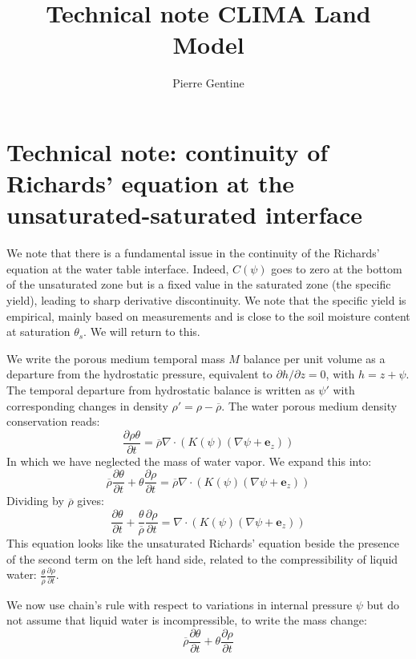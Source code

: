 \documentclass{article}
\title{Technical note CLIMA Land Model}
\author{Pierre Gentine}
\begin{document}
\section{Technical note: continuity of Richards' equation at the unsaturated-saturated interface}
We note that there is a fundamental issue in the continuity of the Richards' equation at the water table interface. Indeed, $C(\psi)$ goes to zero at the bottom of the unsaturated zone but is a fixed value in the saturated zone (the specific yield), leading to sharp derivative discontinuity. We note that the specific yield is empirical, mainly based on measurements and is close to the soil moisture content at saturation $\theta_s$. We will return to this.

We write the porous medium temporal mass $M$ balance per unit volume as a departure from the hydrostatic pressure, equivalent to $\partial h/\partial z=0$, with $h=z+\psi$. The temporal departure from hydrostatic balance is written as $\psi'$ with corresponding changes in density $\rho'=\rho-\overline\rho$. The water porous medium density conservation reads:
\begin{equation}
\frac{\partial \rho \theta}{\partial t} = {\overline{\rho}} \nabla \cdot \left( K(\psi) \left( \nabla \psi + {\mathbf e_z} \right) \right)
\end{equation}
In which we have neglected the mass of water vapor.
We expand this into:
\begin{equation}
{\overline \rho} \frac{\partial \theta}{\partial t} + \theta \frac{\partial \rho}{\partial t} = {\overline \rho} \nabla \cdot \left( K(\psi) \left( \nabla \psi + {\mathbf e_z} \right) \right)
\end{equation}
Dividing by $\overline \rho$ gives:
\begin{equation}
\frac{\partial \theta}{\partial t} + \frac{\theta}{\overline \rho} \frac{\partial \rho}{\partial t} = \nabla \cdot \left( K(\psi) \left( \nabla \psi + {\mathbf e_z} \right) \right)
\end{equation}
This equation looks like the unsaturated Richards’ equation beside the presence of the second term on the left hand side, related to the compressibility of liquid water: $ \frac{\theta}{\overline \rho} \frac{\partial \rho}{\partial t}$.

We now use chain’s rule with respect to variations in internal pressure $\psi$ but do not assume that liquid water is incompressible, to write the mass change:
\begin{equation}
{\overline \rho} \frac{\partial \theta}{\partial t} + \theta \frac{\partial \rho}{\partial t} 
\end{equation}
\end{document}
